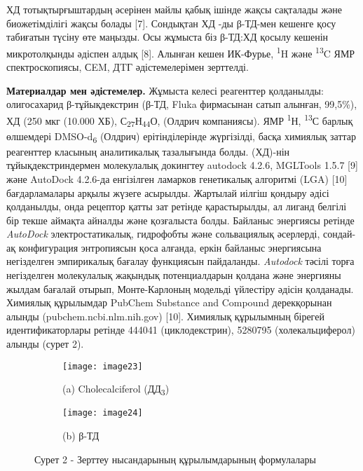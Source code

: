 \begin{multicols}{2}
ХД тотықтырғыштардың әсерінен майлы қабық ішінде жақсы сақталады және
биожетімділігі жақсы болады {[}7{]}. Сондықтан ХД -ды β-ТД-мен кешенге
қосу табиғатын түсіну өте маңызды. Осы жұмыста біз β-ТД:ХД қосылу
кешенін микротолқынды әдіспен алдық {[}8{]}. Алынған кешен ИК-Фурье,
\textsuperscript{1}H және \textsuperscript{13}C ЯМР спектроскопиясы,
СEM, ДTГ әдістемелерімен зерттелді.

{\bfseries Материалдар мен әдістемелер.} Жұмыста келесі реагенттер
қолданылды: олигосахарид β-тұйықдекстрин (β-ТД, Fluka фирмасынан сатып
алынған, 99,5\%), ХД (250 мкг (10.000 ХБ),
С\textsubscript{27}Н\textsubscript{44}О, (Олдрич компаниясы). ЯМР
\textsuperscript{1}Н, \textsuperscript{13}С барлық өлшемдері
DMSO-d\textsubscript{6} (Олдрич) ерітінділерінде жүргізілді, басқа
химиялық заттар реагенттер класының аналитикалық тазалығында болды.
(ХД)-нін тұйықдекстриндермен молекулалық докингтеу autodock 4.2.6,
MGLTools 1.5.7 {[}9{]} және AutoDock 4.2.6-да енгізілген ламарков
генетикалық алгоритмі (LGA) {[}10{]} бағдарламалары арқылы жүзеге
асырылды. Жартылай иілгіш қондыру әдісі қолданылды, онда рецептор қатты
зат ретінде қарастырылды, ал лиганд белгілі бір текше аймақта айналды
және қозғалыста болды. Байланыс энергиясы ретінде \emph{AutoDock}
электростатикалық, гидрофобты және сольвациялық әсерлерді, сондай-ақ
конфигурация энтропиясын қоса алғанда, еркін байланыс энергиясына
негізделген эмпирикалық бағалау функциясын пайдаланды. \emph{Autodock}
тәсілі торға негізделген молекулалық жақындық потенциалдарын қолдана
және энергияны жылдам бағалай отырып, Монте-Карлоның модельді үйлестіру
әдісін қолданады. Химиялық құрылымдар PubChem Substance and Compound
дерекқорынан алынды (pubchem.ncbi.nlm.nih.gov) {[}10{]}. Химиялық
құрылымның бірегей идентификаторлары ретінде 444041 (циклодекстрин),
5280795 (холекальциферол) алынды (сурет 2).
\end{multicols}

\begin{figure}[H]
  \centering
  \begin{subfigure}[b]{0.4\textwidth}
    \centering
    \texttt{[image: image23]}
    \caption*{(a) Cholecalciferol (ДД\textsubscript{3})}
  \end{subfigure}
  \hfill
  \begin{subfigure}[b]{0.4\textwidth}
    \centering
    \texttt{[image: image24]}
    \caption*{(b) β-ТД}
  \end{subfigure}
  \caption*{Сурет 2 - Зерттеу нысандарының құрылымдарының формулалары}
\end{figure}

